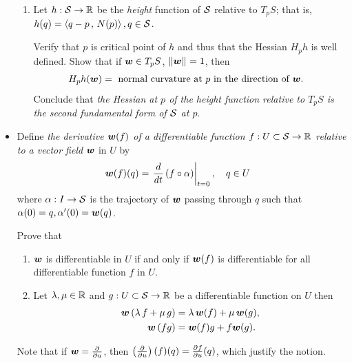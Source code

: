 \documentclass[11pt]{article}
\begin{document}
\begin{itemize}
\begin{example}
\begin{enumerate}
\item \begin{definition} Let $h: {\mathcal S} \rightarrow {\mathbb R}$ be the \emph{height} function of ${\mathcal S}$ relative to $T_{p}S$; that is, $h(q)= \left\langle q-p\,,\, N(p) \right\rangle, q\in 
{\mathcal S}$.  \end{definition} 
Verify that $p$ is critical point of $h$ and thus that the Hessian $H_{p}h$ is well defined. Show that if $\boldsymbol{w}\in T_{p}S$, $\left\|\boldsymbol{w}\right\|_{} = 1$, then 
\begin{align*}
H_{p}h(\boldsymbol{w}) &= \text{ normal curvature at }p\text{ in the direction of }\boldsymbol{w}.
\end{align*}
Conclude that \emph{the Hessian at $p$ of the height function relative to $T_{p}S$ is the second fundamental form of ${\mathcal S}$ at $p$}.\\[10pt]
\end{enumerate}
\end{example}

\item  \begin{definition}
Define \emph{the derivative $\boldsymbol{w}(f)$ of a differentiable function $f: U\subset {\mathcal S} \rightarrow {\mathbb R}$ relative to a vector field} $\boldsymbol{w}$ in $U$ by 
\begin{align*}
\boldsymbol{w}(f)(q) &= \left.{\frac{d}{dt}\left(f\circ \alpha\right)}\right\vert_{t=0},\quad q\in U
\end{align*}
where $\alpha: I\rightarrow {\mathcal S}$ is the trajectory of $\boldsymbol{w}$ passing through $q$ such that $\alpha(0) = q, \alpha'(0)=\boldsymbol{w}(q)$. \end{definition}
\begin{example} Prove that 
\begin{enumerate}
\item $\boldsymbol{w}$ is differentiable in $U$ if and only if $\boldsymbol{w}(f)$ is differentiable for all differentiable function $f$ in $U$.
\item Let $\lambda, \mu\in {\mathbb R}$ and $g: U\subset {\mathcal S} \rightarrow {\mathbb R}$ be a differentiable function on $U$ then 
\begin{align*}
\boldsymbol{w}\left(\lambda\,f+ \mu\, g\right) &= \lambda\,\boldsymbol{w}(f) + \mu\,\boldsymbol{w}(g),\\
\boldsymbol{w}\left(fg\right) &= \boldsymbol{w}(f)g +f\boldsymbol{w}(g).
\end{align*}
\end{enumerate}
\end{example}
Note that if $\boldsymbol{w} = \frac{\partial }{ \partial u}$, then $\left(\frac{\partial }{ \partial u}\right)(f)(q) = \frac{\partial f}{ \partial u}(q)$, which justify the notion.\\


\end{itemize}
\end{document}
